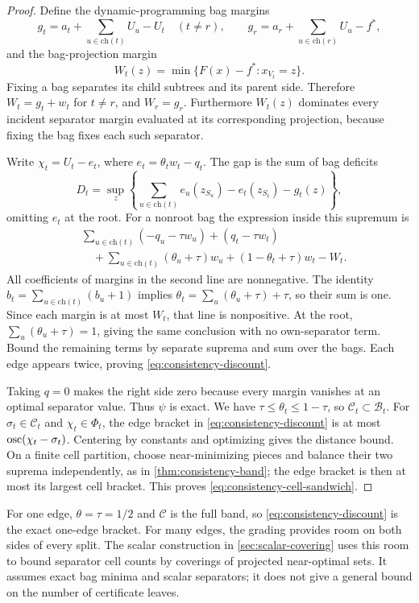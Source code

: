 \begin{proof}
Define the dynamic-programming bag margins
\[
 g_t=a_t+\sum_{u\in\mathrm{ch}(t)}U_u-U_t\quad(t\ne r),\qquad
 g_r=a_r+\sum_{u\in\mathrm{ch}(r)}U_u-f^*,
\]
and the bag-projection margin
\begin{equation}
\label{eq:consistency-bag-margin}
 W_t(z)=\min\{F(x)-f^*:x_{V_t}=z\}.
\end{equation}
Fixing a bag separates its child subtrees and its parent side.  Therefore
$W_t=g_t+w_t$ for $t\ne r$, and $W_r=g_r$.
Furthermore $W_t(z)$ dominates every incident separator margin evaluated
at its corresponding projection, because fixing the bag fixes each such
separator.

Write $\chi_t=U_t-e_t$, where $e_t=\theta_tw_t-q_t$.
The gap is the sum of bag deficits
\[
 D_t=\sup_z\left\{\sum_{u\in\mathrm{ch}(t)}e_u(z_{S_u})
                         -e_t(z_{S_t})-g_t(z)\right\},
\]
omitting $e_t$ at the root.  For a nonroot bag the expression inside this
supremum is
\begin{align*}
 &\sum_{u\in\mathrm{ch}(t)}(-q_u-\tau w_u)+(q_t-\tau w_t)\\
 &\quad+\sum_{u\in\mathrm{ch}(t)}(\theta_u+\tau)w_u
                  +(1-\theta_t+\tau)w_t-W_t.
\end{align*}
All coefficients of margins in the second line are nonnegative.
The identity $b_t=\sum_{u\in\mathrm{ch}(t)}(b_u+1)$ implies
$\theta_t=\sum_u(\theta_u+\tau)+\tau$, so their sum is one.
Since each margin is at most $W_t$, that line is nonpositive.
At the root, $\sum_u(\theta_u+\tau)=1$, giving the same conclusion with
no own-separator term.  Bound the remaining terms by separate suprema
and sum over the bags.  Each edge appears twice, proving
\cref{eq:consistency-discount}.

Taking $q=0$ makes the right side zero because every margin vanishes at
an optimal separator value.  Thus $\psi$ is exact.
We have $\tau\le\theta_t\le1-\tau$, so $\mathcal C_t\subset\mathcal B_t$.
For $\sigma_t\in\mathcal C_t$ and $\chi_t\in\Phi_t$, the edge bracket
in \cref{eq:consistency-discount} is at most
$\operatorname{osc}(\chi_t-\sigma_t)$.  Centering by constants and optimizing gives
the distance bound.  On a finite cell partition, choose near-minimizing
pieces and balance their two suprema independently, as in
\cref{thm:consistency-band}; the edge bracket is then at most its largest
cell bracket.  This proves \cref{eq:consistency-cell-sandwich}.
\end{proof}

For one edge, $\theta=\tau=1/2$ and $\mathcal C$ is the full band, so
\cref{eq:consistency-discount} is the exact one-edge bracket.
For many edges, the grading provides room on both sides of every split.
The scalar construction in \cref{sec:scalar-covering} uses this room to
bound separator cell counts by coverings of projected near-optimal sets.
It assumes exact bag minima and scalar separators; it does not give a
general bound on the number of certificate leaves.


